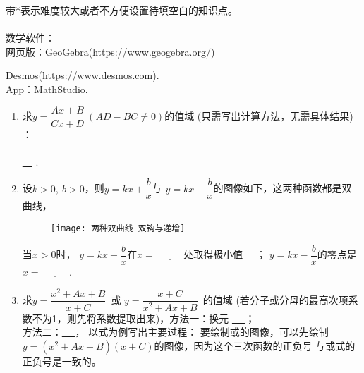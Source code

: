 \documentclass{article}
\newif\ifte
\renewcommand\geq\geqslant
\begin{document}
\begin{multicols}{2}    

\noindent 带*表示难度较大或者不方便设置待填空白的知识点。\\
\\
数学软件：\\
网页版：GeoGebra(https://www.geogebra.org/)

\hspace{0.68cm} Desmos(https://www.desmos.com).\\
App：MathStudio. 

\begin{enumerate}[leftmargin=20pt]

\section{函数}
\item 求$ y=\dfrac{Ax+B}{Cx+D}\ (AD-BC\neq 0) $的值域 
    \ifte \else (只需写出计算方法，无需具体结果) \fi：\\
\ifte  \underline{\ $ y=\dfrac{A}{C}\cdot\dfrac{x+
\dfrac{D}{C}-\dfrac{D}{C}+ \dfrac{B}{A}}{x+\dfrac{D}{C}}
=\dfrac{A}{C}\cdot\left(
1+\dfrac{-\dfrac{D}{C}+\dfrac{B}{A}}{x+\dfrac{D}{C}}\right)
 $ } \else \\ \underline{\  \hspace{8cm}\ } \fi .

\item 设$ k>0,\ b>0 $，则$ y=kx+\dfrac{b}{x} $与
$ y=kx-\dfrac{b}{x} $的图像如下，这两种函数都是双曲线，
\begin{figure}[H]
    \centering
    \texttt{[image: 两种双曲线\_双钩与递增]}
\end{figure}
当$ x>0 $时，
$ y=kx+\dfrac{b}{x} $在$ x=\underline{\ \ifte \sqrt{\dfrac{b}{k}}
  \else \hspace{1cm} \fi\ } $处取得极小值\underline{\ \ifte 
  $ 2\sqrt{kb} $\else \hspace{2cm} \fi\ }；
$ y=kx-\dfrac{b}{x} $的零点是$ x=\underline{\ \ifte \sqrt{\dfrac{b}{k}}
    \else \hspace{1cm} \fi\ } $.

\item 求$ y=\dfrac{x^2+Ax+B}{x+C} $\ 或
$ y=\dfrac{x+C}{x^2+Ax+B} $\ 的值域
(若分子或分母的最高次项系数不为1，则先将系数提取出来)，方法一：换元
\underline{\ \ifte $ t=x+C $\else \hspace{2cm} \fi\ }；\\
方法二：\underline{\ \ifte 判别式\else \hspace{1.5cm} \fi\ }，
以式为例写出主要过程：\ifte 
\begin{gather*}
    y(x+C)=x^2+Ax+B \\
    x^2+(A-y)x+B-yC=0 \\
    \Delta=(A-y)^2-4(B-yC) \geq 0
\end{gather*}
\else \vspace{1.5cm} \fi  
要绘制或的图像，可以先绘制
$ y=(x^2+Ax+B)(x+C) $的图像，因为这个三次函数的正负号
与或式的正负号是一致的。


\end{enumerate}
\end{multicols}
\end{document}
